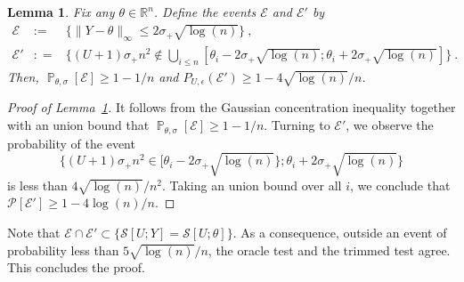 \documentclass[twoside,11pt]{article}
\newtheorem{lem}{Lemma}
\def\cE{\mathcal{E}}
\def\cP{\mathcal{P}}
\def\cS{\mathcal{S}}
\renewcommand{\P}{\operatorname{\mathbb{P}}}
\newcommand{\<}{\langle}
\renewcommand{\>}{\rangle}
\begin{document}
\begin{lem}\label{lem:U}
Fix any $\theta\in \mathbb{R}^n$. Define the events $\cE$ and $\cE'$  by 
\begin{eqnarray*}
\cE&:=&\{\|Y-\theta\|_{\infty}\leq 2\sigma_+ \sqrt{\log(n)}\}\ ,\\
\cE'&: = &\{(U+1)\sigma_+n^2 \not\in\bigcup_{i \leq n} [\theta_i - 2\sigma_+ \sqrt{\log(n)}; \theta_i+2\sigma_+ \sqrt{\log(n)}]\}\ .
 \end{eqnarray*}
Then, $\P_{\theta,\sigma}[\cE]\geq 1-1/n$ and $P_{U,\epsilon}(\cE') \geq 1- 4\sqrt{\log(n)}/n$.
\end{lem}

\begin{proof}[Proof of Lemma~\ref{lem:U}]
It follows from the Gaussian concentration inequality together with an union bound that $\P_{\theta,\sigma}[\cE]\geq 1-1/n$. Turning to $\cE'$, we observe the probability of the event 
\[
 \Big\{(U+1)\sigma_+n^2 \in  [\theta_i - 2\sigma_+ \sqrt{\log(n)}\}; \theta_i+2\sigma_+ \sqrt{\log(n)}\Big\}
\]
is less than $4\sqrt{\log(n)}/n^2$. Taking an union bound over all $i$, we conclude that $\cP[\cE']\geq 1-4\log(n)/n$. 
\end{proof}
Note that $\cE\cap \cE' \subset \{\cS[ U; Y]= \cS[U; \theta]\}$. As a consequence, outside an event of probability less than $5\sqrt{\log(n)}/n$, the oracle test and the trimmed test agree. This concludes the proof.
\end{document}
